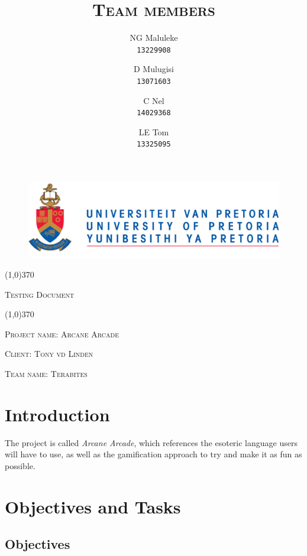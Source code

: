\documentclass[english]{article}
\title{\scshape\Large Team members}
\author{
	NG Maluleke\\
	\texttt{13229908}
	\and
	D Mulugisi\\
	\texttt{13071603}
	\and
	C Nel\\
	\texttt{14029368}
	\and
	LE Tom\\
	\texttt{13325095}
}
\begin{document}
	
	\begin{figure}
		\includegraphics[width=\linewidth]{up_logo.png}
	\end{figure}
	
	\begin{center}
	 \line(1,0){370}
	\\[0.2cm]
    {\scshape\Large Testing Document \par}
	\vspace{0.1cm}
	\line(1,0){370}
	\\[0.8cm]
	
	{\scshape\large Project name: Arcane Arcade\par}	
	\vspace{1cm}
	{\scshape\large Client: Tony vd Linden\par}
	\vspace{1cm}
	{\scshape\large Team name: Terabites\par}
	\vspace{1cm}
	{\let\newpage\relax\maketitle}
	\end{center}
	
	
	\newpage
	\tableofcontents

	\newpage
	
	\section{Introduction}
		 The project is called \textit{Arcane Arcade}, which references the esoteric language users will have to use, as well as the gamification approach to try and make it as fun as possible.

	\section{Objectives and Tasks}
		\subsection{Objectives}
\end{document}
